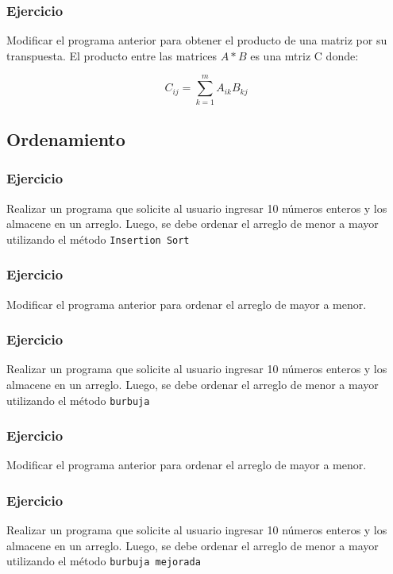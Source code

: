 \subsubsection{Ejercicio}
Modificar el programa anterior para obtener el producto de una matriz por su transpuesta. El producto entre las matrices $A*B$ es una mtriz C donde:

$$C_{ij}=\sum_{k=1}^{m}{A_{ik}B_{kj}} $$

\subsection*{Ordenamiento}
\subsubsection{Ejercicio}
Realizar un programa que solicite al usuario ingresar 10 números enteros y los almacene en un arreglo. Luego, se debe ordenar el arreglo de menor a mayor utilizando el método \texttt{Insertion Sort}

\subsubsection{Ejercicio}
Modificar el programa anterior para ordenar el arreglo de mayor a menor.

\subsubsection{Ejercicio}
Realizar un programa que solicite al usuario ingresar 10 números enteros y los almacene en un arreglo. Luego, se debe ordenar el arreglo de menor a mayor utilizando el método \texttt{burbuja}

\subsubsection{Ejercicio}
Modificar el programa anterior para ordenar el arreglo de mayor a menor.

\subsubsection{Ejercicio}
Realizar un programa que solicite al usuario ingresar 10 números enteros y los almacene en un arreglo. Luego, se debe ordenar el arreglo de menor a mayor utilizando el método \texttt{burbuja mejorada}

